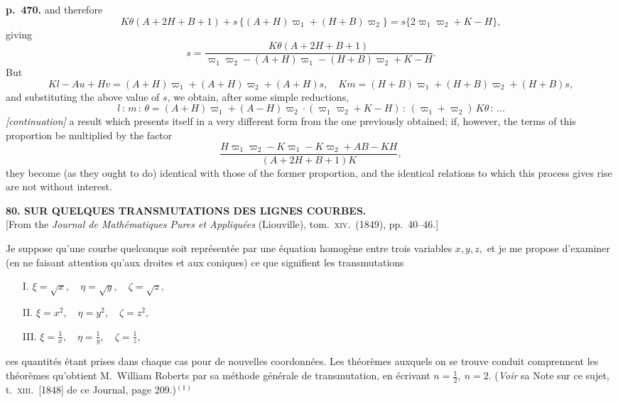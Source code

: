 \documentclass[11pt]{article}
\begin{document}
\bigskip
\noindent\textbf{p.~470.} and therefore
\[ K\theta(A + 2H + B + 1) + s\,\{(A + H)\varpi_1 + (H + B)\varpi_2\} = s\{2\varpi_1\varpi_2 + K - H\}, \]
giving
\[ s = \frac{K\theta(A + 2H + B + 1)}{\varpi_1\varpi_2 - (A + H)\varpi_1 - (H + B)\varpi_2 + K - H}. \]
But
\[ Kl - Au + Hv = (A + H)\varpi_1 + (A + H)\varpi_2 + (A + H)s,\quad Km = (H + B)\varpi_1 + (H + B)\varpi_2 + (H + B)s, \]
and substituting the above value of $s$, we obtain, after some simple reductions,
\[ l\,:\,m\,:\,\theta = (A + H)\varpi_1 + (A - H)\varpi_2 \cdot (\varpi_1\varpi_2 + K - H)\,:\,(\varpi_1 + \varpi_2)\,K\theta\,:\,\text{...} \]
\textit{[continuation]} a result which presents itself in a very different form from the one previously obtained; if, however, the terms of this proportion be multiplied by the factor
\[ \frac{H\varpi_1\varpi_2 - K\varpi_1 - K\varpi_2 + AB - KH}{(A + 2H + B + 1)K}, \]
they become (as they ought to do) identical with those of the former proportion, and the identical relations to which this process gives rise are not without interest.

\bigskip
\begin{center}
\textbf{80. SUR QUELQUES TRANSMUTATIONS DES LIGNES COURBES.}\\[2pt]
[From the \textit{Journal de Math\'ematiques Pures et Appliqu\'ees} (Liouville), tom.~\textsc{xiv}.\ (1849), pp.~40--46.]
\end{center}

Je suppose qu'une courbe quelconque soit repr\'esent\'ee par une \'equation homog\`ene entre trois variables $x, y, z,$ et je me propose d'examiner (en ne faisant attention qu'aux droites et aux coniques) ce que signifient les transmutations
\begin{itemize}
\item[I.] $\xi = \sqrt{x},\quad \eta = \sqrt{y},\quad \zeta = \sqrt{z},$
\item[II.] $\xi = x^2,\quad \eta = y^2,\quad \zeta = z^2,$
\item[III.] $\xi = \tfrac{1}{x},\quad \eta = \tfrac{1}{y},\quad \zeta = \tfrac{1}{z},$
\end{itemize}
ces quantit\'es \'etant prises dans chaque cas pour de nouvelles coordonn\'ees. Les th\'eor\`emes auxquels on se trouve conduit comprennent les th\'eor\`emes qu'obtient M.\ William Roberts par sa m\'ethode g\'en\'erale de transmutation, en \'ecrivant $n = \tfrac{1}{2},\ n = 2$. (\textit{Voir} sa Note sur ce sujet, t.~\textsc{xiii}.\ [1848] de ce Journal, page 209.)$^{(1)}$
\end{document}
